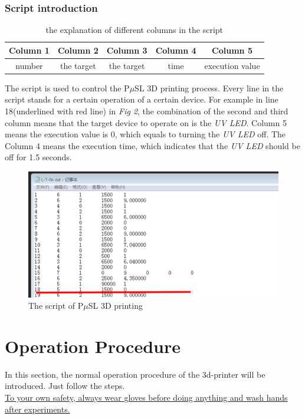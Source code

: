 \documentclass[a4paper]{article}
\begin{document}
\subsubsection{Script introduction}
\begin{table}
  \begin{center}
    \begin{tabular}{ | c | c | c | c | c |}
      \hline
      Column 1 & Column 2 & Column 3 & Column 4 & Column 5 \\
      \hline
      number&the target&the target&time&execution value\\
      \hline
    \end{tabular}
    \caption{the explanation of different columns in the script}
  \end{center}
\end{table}
The script is used to control the P$\mu$SL 3D printing process. Every line in the script stands for a certain operation of 
a certain device. For example in line 18(underlined with red line) in \textit{Fig 2}, the combination of the second and third 
column means that the target device to operate on is the \textit{UV LED}. Column 5 means the execution value is 0, which equals 
to turning the \textit{UV LED} off. The Column 4 means the execution time, which indicates that the \textit{UV LED} should be 
off for 1.5 seconds.
\begin{figure}
  \centering
  \includegraphics{script22.png}
  \caption{The script of P$\mu$SL 3D printing }
\end{figure}
\pagebreak





\section{Operation Procedure}\label{sec:page-layout}
In this section, the normal operation procedure of the 3d-printer will be introduced. Just follow the steps. \\
\underline {To your own safety, always wear gloves before doing anything and wash hands after experiments.}
\end{document}
